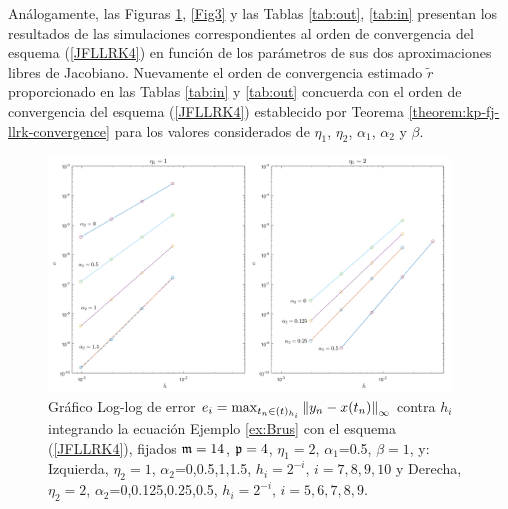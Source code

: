 Análogamente, las Figuras \ref{Fig2}, \ref{Fig3} y las Tablas \ref{tab:out}, \ref{tab:in} presentan los resultados de las simulaciones correspondientes al orden de convergencia del esquema (\ref{JFLLRK4}) en función de los parámetros de sus dos aproximaciones libres de Jacobiano. Nuevamente el orden de convergencia estimado $\widetilde{r}$ proporcionado en las Tablas \ref{tab:in} y \ref{tab:out} concuerda con el orden de convergencia del esquema (\ref{JFLLRK4}) establecido por Teorema \ref{theorem:kp-fj-llrk-convergence} para los valores considerados de $\eta_1$, $\eta_2$, $\alpha_1$, $\alpha_2$ y $\beta$.


\begin{figure}[htb]
	\centering
	\includegraphics[width=0.95\textwidth]{Graphics/lldp-fj/out_new.png}
	\caption{Gráfico Log-log de error $e_i=\max_{t_n\in(t)_{h_i}}\left\lVert y_n-x(t_n) \right\rVert_\infty$ contra $h_i$ integrando la ecuación Ejemplo \ref{ex:Brus} con el esquema (\ref{JFLLRK4}), fijados $\mathfrak{m}=14$, $\mathfrak{p}=4$, $\eta_1=2$, $\alpha_1$=0.5, $\beta=1$, y: Izquierda, $\eta_2=1$, $\alpha_2$=0,0.5,1,1.5, $h_i=2^{-i}$, $i=7,8,9,10$ y Derecha, $\eta_2=2$, $\alpha_2$=0,0.125,0.25,0.5, $h_i=2^{-i}$, $i=5,6,7,8,9$.}
	\label{Fig2}
\end{figure}


